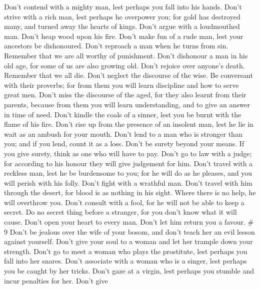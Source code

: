  Don't contend with a mighty man, lest perhaps you fall into
his hands.  Don't strive with a rich man, lest perhaps he
overpower you; for gold has destroyed many, and turned away the hearts
of kings.  Don't argue with a loudmouthed man. Don't heap
wood upon his fire.  Don't make fun of a rude man, lest your
ancestors be dishonoured.  Don't reproach a man when he
turns from sin. Remember that we are all worthy of punishment.
 Don't dishonour a man in his old age, for some of us are
also growing old.  Don't rejoice over anyone's death.
Remember that we all die.  Don't neglect the discourse of
the wise. Be conversant with their proverbs; for from them you will
learn discipline and how to serve great men.  Don't miss the
discourse of the aged, for they also learnt from their parents, because
from them you will learn understanding, and to give an answer in time of
need.  Don't kindle the coals of a sinner, lest you be
burnt with the flame of his fire.  Don't rise up from the
presence of an insolent man, lest he lie in wait as an ambush for your
mouth.  Don't lend to a man who is stronger than you; and
if you lend, count it as a loss.  Don't be surety beyond
your means. If you give surety, think as one who will have to pay.
 Don't go to law with a judge; for according to his honour
they will give judgement for him.  Don't travel with a
reckless man, lest he be burdensome to you; for he will do as he
pleases, and you will perish with his folly.  Don't fight
with a wrathful man. Don't travel with him through the desert, for blood
is as nothing in his sight. Where there is no help, he will overthrow
you.  Don't consult with a fool, for he will not be able to
keep a secret.  Do no secret thing before a stranger, for
you don't know what it will cause.  Don't open your heart
to every man. Don't let him return you a favour. \# 9  Don't
be jealous over the wife of your bosom, and don't teach her an evil
lesson against yourself.  Don't give your soul to a woman
and let her trample down your strength.  Don't go to meet a
woman who plays the prostitute, lest perhaps you fall into her snares.
 Don't associate with a woman who is a singer, lest perhaps
you be caught by her tricks.  Don't gaze at a virgin, lest
perhaps you stumble and incur penalties for her.  Don't give

